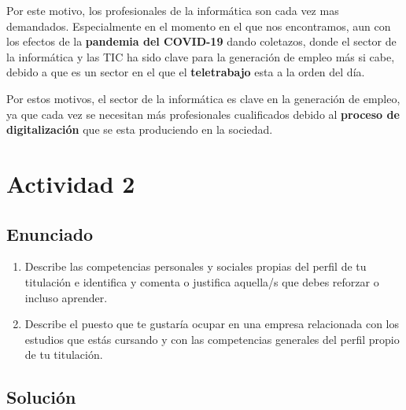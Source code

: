 Por este motivo, los profesionales de la informática son cada vez mas demandados. Especialmente en el momento en el que nos encontramos, aun con los efectos de la  \textbf{pandemia del COVID-19} dando coletazos, donde el sector de la informática y las TIC ha sido clave para la generación de empleo más si cabe, debido a que es un sector en el que el \textbf{teletrabajo} esta a la orden del día.

Por estos motivos, el sector de la informática es clave en la generación de empleo, ya que cada vez se necesitan más profesionales cualificados debido al \textbf{proceso de digitalización} que se esta produciendo en la sociedad.

\section{Actividad 2}
\subsection{Enunciado}
    \begin{enumerate}[label=(\alph*)]
    \item Describe las competencias personales y sociales propias del perfil de tu titulación e identifica y comenta o justifica aquella/s que debes reforzar o incluso aprender.
    \item Describe el  puesto que te gustaría ocupar en una empresa relacionada con los estudios que estás cursando y con las competencias generales del perfil propio de tu titulación.
\end{enumerate}

\subsection{Solución}

